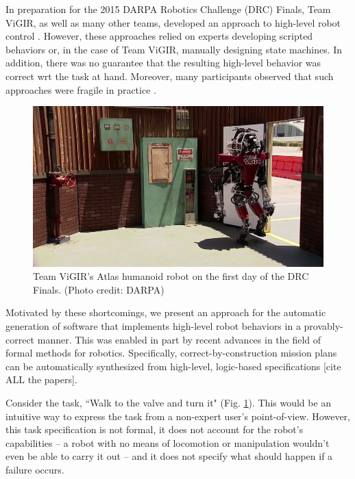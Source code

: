 
In preparation for the 2015 DARPA Robotics Challenge (DRC) Finals, Team ViGIR, as well as many other teams, developed an approach to high-level robot control \cite{Philipp2013Bsc, Philipp2015Msc}.
However, these approaches relied on experts developing scripted behaviors or, in the case of Team ViGIR, manually designing state machines.
In addition, there was no guarantee that the resulting high-level behavior was correct \ac{wrt} the task at hand.
Moreover, many participants observed that such approaches were fragile in practice \cite{DRC-what-happened}.

\begin{figure}[t]
\centering
\includegraphics[width=0.99\columnwidth,clip]{./img/atlas_door_finals.png}
\caption{Team ViGIR's Atlas humanoid robot on the first day of the DRC Finals. (Photo credit: DARPA)
}
\label{Fig:AtlasDoorFinals}
\end{figure}

Motivated by these shortcomings, we present an approach for the automatic generation of software that implements high-level robot behaviors in a provably-correct manner.
This was enabled in part by recent advances in the field of formal methods for robotics.
Specifically, correct-by-construction mission plans can be automatically synthesized from high-level, logic-based specifications [cite ALL the papers].

\begin{myExample}\label{Ex:PickupObject}
	Consider the task, ``Walk to the valve and turn it" (Fig. \ref{Fig:AtlasDoorFinals}).
	This would be an intuitive way to express the task from a non-expert user's point-of-view.
	However, this task specification is not formal, it does not account for the robot's capabilities -- a robot with no means of locomotion or manipulation wouldn't even be able to carry it out -- and it does not specify what should happen if a failure occurs. %
\end{myExample}

